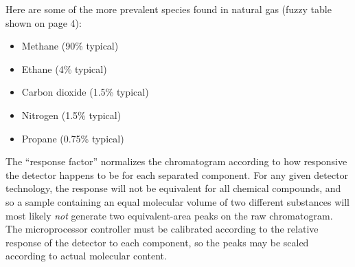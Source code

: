 \vskip 10pt

Here are some of the more prevalent species found in natural gas (fuzzy table shown on page 4):

\begin{itemize}
\item{} Methane (90\% typical)
\item{} Ethane (4\% typical)
\item{} Carbon dioxide (1.5\% typical)
\item{} Nitrogen (1.5\% typical)
\item{} Propane (0.75\% typical)
\end{itemize}

\vskip 10pt

The ``response factor'' normalizes the chromatogram according to how responsive the detector happens to be for each separated component.  For any given detector technology, the response will not be equivalent for all chemical compounds, and so a sample containing an equal molecular volume of two different substances will most likely {\it not} generate two equivalent-area peaks on the raw chromatogram.  The microprocessor controller must be calibrated according to the relative response of the detector to each component, so the peaks may be scaled according to actual molecular content.




